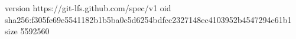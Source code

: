 version https://git-lfs.github.com/spec/v1
oid sha256:f305fe69e5541182b1b5ba0c5d6254bdfcc2327148ec4103952b4547294c61b1
size 5592560
